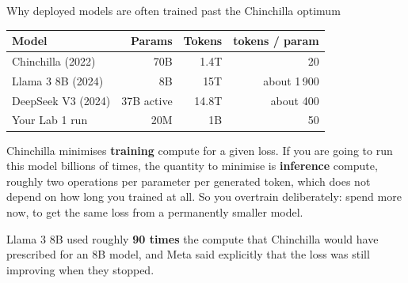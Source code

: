 \documentclass[aspectratio=169,10pt]{beamer}
\begin{document}
\begin{frame}[shrink=12]{Why deployed models are often trained past the Chinchilla optimum}
  \centering
  \begin{tabular}{@{}L{3.2cm} r r r@{}}
    \toprule
    \textbf{Model} & \textbf{Params} & \textbf{Tokens} & \textbf{tokens / param}\\
    \midrule
    Chinchilla (2022) & 70B & 1.4T & 20\\
    Llama 3 8B (2024) & 8B & 15T & about 1\,900\\
    DeepSeek V3 (2024) & 37B active & 14.8T & about 400\\
    Your Lab 1 run & 20M & 1B & 50\\
    \bottomrule
  \end{tabular}
  \vspace{0.8em}
  \begin{gotcha}
    Chinchilla minimises \textbf{training} compute for a given loss. If you are
    going to run this model billions of times, the quantity to minimise is
    \textbf{inference} compute, roughly two operations per parameter per
    generated token, which does not depend on how long you trained at all.
    \vspace{0.3em}
    So you overtrain deliberately: spend more now, to get the same loss from a
    permanently smaller model.
  \end{gotcha}
  \vspace{0.4em}
  \small
  Llama 3 8B used roughly \textbf{90 times} the compute that Chinchilla would
  have prescribed for an 8B model, and Meta said explicitly that the loss was
  still improving when they stopped.
\end{frame}
\end{document}
